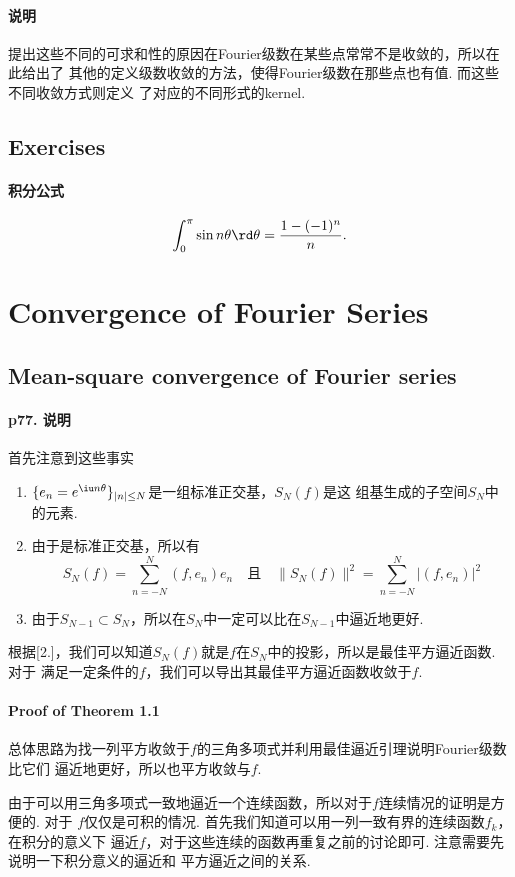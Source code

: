   \paragraph{说明}
    提出这些不同的可求和性的原因在Fourier级数在某些点常常不是收敛的，所以在此给出了
    其他的定义级数收敛的方法，使得Fourier级数在那些点也有值. 而这些不同收敛方式则定义
    了对应的不同形式的kernel.

  


\subsection{Exercises}
  \paragraph{积分公式}
  \[
    \int_0^\pi\sin n\theta\rd\theta = \frac{1-(-1)^n}{n}.
  \]

\newpage
\section{Convergence of Fourier Series}

\subsection{Mean-square convergence of Fourier series}
  \paragraph{p77. 说明}
    首先注意到这些事实
    \begin{enumerate}
      \item $\{e_n=e^{\iu n\theta}\}_{|n|\le N}$是一组标准正交基，$S_N(f)$是这
        组基生成的子空间$S_N$中的元素.
      \item 由于是标准正交基，所以有
        \[
          S_N(f)=\sum_{n=-N}^N (f,e_n)e_n  \quad\text{且}\quad 
          \|S_N(f)\|^2= \sum_{n=-N}^N |(f,e_n)|^2
        \]
      \item 由于$S_{N-1}\subset S_N$，所以在$S_N$中一定可以比在$S_{N-1}$中逼近地更好.
    \end{enumerate}
    根据[2.]，我们可以知道$S_N(f)$就是$f$在$S_N$中的投影，所以是最佳平方逼近函数. 对于
    满足一定条件的$f$，我们可以导出其最佳平方逼近函数收敛于$f$.

  \paragraph{Proof of Theorem 1.1}
    总体思路为找一列平方收敛于$f$的三角多项式并利用最佳逼近引理说明Fourier级数比它们
    逼近地更好，所以也平方收敛与$f$.\par
    由于可以用三角多项式一致地逼近一个连续函数，所以对于$f$连续情况的证明是方便的. 对于
    $f$仅仅是可积的情况. 首先我们知道可以用一列一致有界的连续函数$f_k$，在积分的意义下
    逼近$f$，对于这些连续的函数再重复之前的讨论即可. 注意需要先说明一下积分意义的逼近和
    平方逼近之间的关系.

